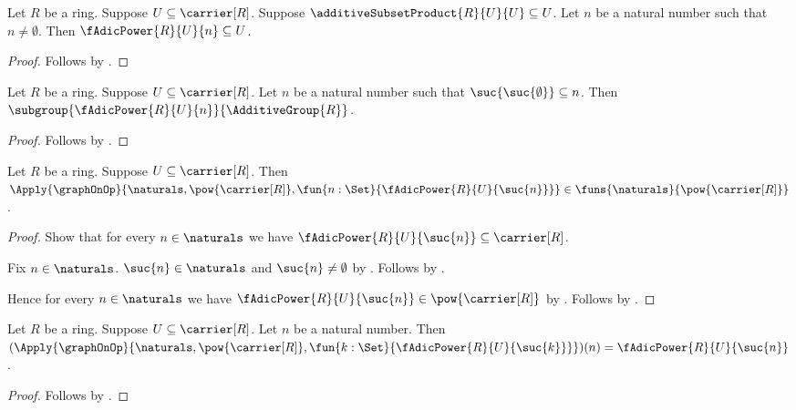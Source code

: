 \begin{theorem}\label{f_adic_power_subset_of_contraction}
    Let $R$ be a ring. Suppose $U\subseteq\carrier[R]$.
    Suppose $\additiveSubsetProduct{R}{U}{U}\subseteq U$.
    Let $n$ be a natural number such that $n\neq\emptyset$.
    Then $\fAdicPower{R}{U}{n}\subseteq U$.
\end{theorem}
\begin{proof}
    Follows by
        .
\end{proof}

\begin{theorem}\label{f_adic_power_is_subgroup}
    Let $R$ be a ring. Suppose $U\subseteq\carrier[R]$.
    Let $n$ be a natural number such that
        $\suc{\suc{\emptyset}}\subseteq n$.
    Then $\subgroup{\fAdicPower{R}{U}{n}}{\AdditiveGroup{R}}$.
\end{theorem}
\begin{proof}
    Follows by .
\end{proof}

\begin{proposition}\label{f_adic_power_family_type}
    Let $R$ be a ring. Suppose $U\subseteq\carrier[R]$.
    Then
        $\Apply{\graphOnOp}{
            \naturals,\pow{\carrier[R]},
            \fun{n:\Set}{\fAdicPower{R}{U}{\suc{n}}}}
        \in\funs{\naturals}{\pow{\carrier[R]}}$.
\end{proposition}
\begin{proof}
    Show that for every $n\in\naturals$ we have
        $\fAdicPower{R}{U}{\suc{n}}\subseteq\carrier[R]$.
    \begin{subproof}
        Fix $n\in\naturals$.
        $\suc{n}\in\naturals$ and $\suc{n}\neq\emptyset$ by
            .
        Follows by .
    \end{subproof}
    Hence for every $n\in\naturals$ we have
        $\fAdicPower{R}{U}{\suc{n}}\in\pow{\carrier[R]}$ by
        .
    Follows by .
\end{proof}

\begin{proposition}\label{f_adic_power_family_apply}
    Let $R$ be a ring. Suppose $U\subseteq\carrier[R]$.
    Let $n$ be a natural number.
    Then
        $(\Apply{\graphOnOp}{
            \naturals,\pow{\carrier[R]},
            \fun{k:\Set}{\fAdicPower{R}{U}{\suc{k}}}})(n)
        =\fAdicPower{R}{U}{\suc{n}}$.
\end{proposition}
\begin{proof}
    Follows by .
\end{proof}

